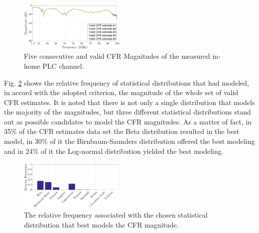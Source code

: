 \documentclass[journal]{IEEEtran}
\begin{document}
\begin{figure}[h]
	\centering
	\includegraphics[width=0.45\textwidth]{images/respfreq_1.7.eps}
	\caption{Five consecutive and valid \ac{CFR} Magnitudes of the measured in-home \ac{PLC} channel.}
	\label{respfreq}
\end{figure}

Fig. \ref{MAG_percent} shows the relative frequency of statistical distributions that had modeled, in accord with the adopted criterion, the magnitude of the whole set of valid \ac{CFR} estimates. It is noted that there is not only a single distribution that models the majority of the magnitudes, but three different statistical distributions stand out as possible candidates to model the \ac{CFR} magnitudes. As a matter of fact, in 35\% of the \ac{CFR} estimates data set the Beta distribution resulted in the best model, in 30\% of it  the Birnbaum-Saunders distribution offered the best modeling and in 24\% of it the Log-normal distribution yielded the best modeling. 

\begin{figure}[h!]
	\centering
	\includegraphics[width=0.45\textwidth]{images/Mag_percent.eps}
	\caption{The relative frequency associated with the chosen statistical distribution that best models the \ac{CFR} magnitude.}
	\label{MAG_percent}
\end{figure}
\end{document}
